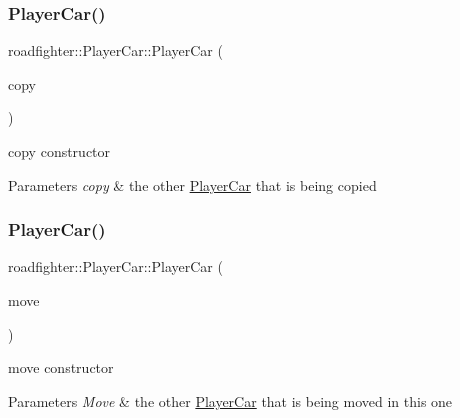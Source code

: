 \subsubsection{\texorpdfstring{Player\+Car()}{PlayerCar()}\hspace{0.1cm}{\footnotesize\ttfamily [3/4]}}
{\footnotesize\ttfamily roadfighter\+::\+Player\+Car\+::\+Player\+Car (\begin{DoxyParamCaption}\item[{const \hyperlink{classroadfighter_1_1PlayerCar}{Player\+Car} \&}]{copy }\end{DoxyParamCaption})\hspace{0.3cm}{\ttfamily [default]}}

copy constructor 
\begin{DoxyParams}{Parameters}
{\em copy} & the other \hyperlink{classroadfighter_1_1PlayerCar}{Player\+Car} that is being copied \\
\hline
\end{DoxyParams}
\mbox{\label{classroadfighter_1_1PlayerCar_a1243a4b2ec289c99884cb1c5f8a57531}} 
\subsubsection{\texorpdfstring{Player\+Car()}{PlayerCar()}\hspace{0.1cm}{\footnotesize\ttfamily [4/4]}}
{\footnotesize\ttfamily roadfighter\+::\+Player\+Car\+::\+Player\+Car (\begin{DoxyParamCaption}\item[{\hyperlink{classroadfighter_1_1PlayerCar}{Player\+Car} \&\&}]{move }\end{DoxyParamCaption})\hspace{0.3cm}{\ttfamily [default]}}

move constructor 
\begin{DoxyParams}{Parameters}
{\em Move} & the other \hyperlink{classroadfighter_1_1PlayerCar}{Player\+Car} that is being moved in this one \\
\hline
\end{DoxyParams}
\mbox{\label{classroadfighter_1_1PlayerCar_a7da4510fe32e4380f7a5771849ac082c}} 
